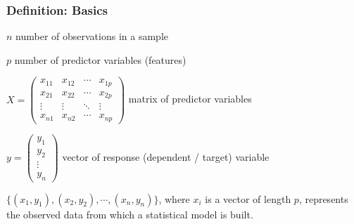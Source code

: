 \documentclass{beamer}
\begin{document}
\begin{frame}
	\frametitle{Definition: Basics}
	
	$n$ number of observations in a sample
	
	$p$ number of predictor variables (features)
	
	\vspace{0.5cm}
	
	$X = \left(
	\begin{matrix}
		x_{11} & x_{12} & \cdots & x_{1p} \\
		x_{21} & x_{22} & \cdots & x_{2p} \\
		\vdots & \vdots & \ddots & \vdots \\
		x_{n1} & x_{n2} & \cdots & x_{np}
	\end{matrix} 
	\right)$
	\small{matrix of predictor variables}
	
	\hspace{0.5cm}	
	
	$y = \left(
	\begin{matrix}
		y_1  \\
		y_2  \\
		\vdots  \\
		y_n 
	\end{matrix} 
	\right)$  
	\small{vector of response (dependent / target) variable}
	
	\hspace{0.5cm}
	
	$\{(x_1, y_1), (x_2, y_2), \cdots, (x_n, y_n) \}$, where $x_i$ is a vector of 
	length $p$, represents the observed data from which 
	a statistical model is built. 			
\end{frame}
\end{document}
